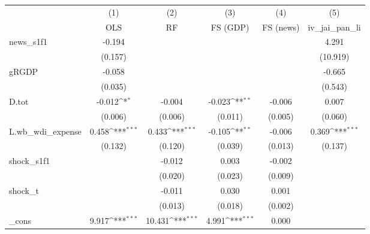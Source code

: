 {
\def\sym#1{\ifmmode^{#1}\else\(^{#1}\)\fi}
\begin{tabular}{l*{5}{c}}
\toprule
            &\multicolumn{1}{c}{(1)}&\multicolumn{1}{c}{(2)}&\multicolumn{1}{c}{(3)}&\multicolumn{1}{c}{(4)}&\multicolumn{1}{c}{(5)}\\
            &\multicolumn{1}{c}{OLS}&\multicolumn{1}{c}{RF}&\multicolumn{1}{c}{FS (GDP)}&\multicolumn{1}{c}{FS (news)}&\multicolumn{1}{c}{iv\_jai\_pan\_li}\\
\midrule
news\_s1f1   &      -0.194         &                     &                     &                     &       4.291         \\
            &     (0.157)         &                     &                     &                     &    (10.919)         \\
\addlinespace
gRGDP       &      -0.058         &                     &                     &                     &      -0.665         \\
            &     (0.035)         &                     &                     &                     &     (0.543)         \\
\addlinespace
D.tot       &      -0.012\sym{*}  &      -0.004         &      -0.023\sym{**} &      -0.006         &       0.007         \\
            &     (0.006)         &     (0.006)         &     (0.011)         &     (0.005)         &     (0.060)         \\
\addlinespace
L.wb\_wdi\_expense&       0.458\sym{***}&       0.433\sym{***}&      -0.105\sym{**} &      -0.006         &       0.369\sym{***}\\
            &     (0.132)         &     (0.120)         &     (0.039)         &     (0.013)         &     (0.137)         \\
\addlinespace
shock\_s1f1  &                     &      -0.012         &       0.003         &      -0.002         &                     \\
            &                     &     (0.020)         &     (0.023)         &     (0.009)         &                     \\
\addlinespace
shock\_t     &                     &      -0.011         &       0.030         &       0.001         &                     \\
            &                     &     (0.013)         &     (0.018)         &     (0.002)         &                     \\
\addlinespace
\_cons      &       9.917\sym{***}&      10.431\sym{***}&       4.991\sym{***}&       0.000         &                     \\

\end{tabular}}
